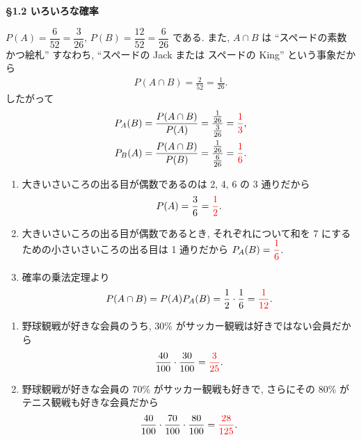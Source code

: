 \vspace{\baselineskip}
{\textbf{\S 1.2 \indent いろいろな確率}}
\basic
\begin{qenumerate}
	\item{
		$P(A) = \dfrac{6}{52} = \dfrac{3}{26}$, $P(B) = \dfrac{12}{52} = \dfrac{6}{26}$ である.
		また, $A\cap B$ は ``スペードの素数かつ絵札'' すなわち, ``スペードの Jack または スペードの King'' という事象だから
		\begin{align}
			P(A\cap B) = \frac{2}{52} = \frac{1}{26}.
		\end{align}
		したがって
		\begin{align}
			P_{A}(B) &= \frac{P(A\cap B)}{P(A)} = \frac{\frac{1}{26}}{\frac{3}{26}} = \textcolor{red}{\frac{1}{3}}, \\
			P_{B}(A) &= \frac{P(A\cap B)}{P(B)} = \frac{\frac{1}{26}}{\frac{6}{26}} = \textcolor{red}{\frac{1}{6}}.
		\end{align}
	}
	\item{
		\begin{enumerate}
			\item{
				大きいさいころの出る目が偶数であるのは 2, 4, 6 の 3 通りだから
				\begin{align}
					P(A) = \frac{3}{6} = \textcolor{red}{\frac{1}{2}}.
				\end{align}
			}
			\item{
				大きいさいころの出る目が偶数であるとき, それぞれについて和を 7 にするための小さいさいころの出る目は 1 通りだから $P_{A}(B) = \textcolor{red}{\dfrac{1}{6}}$.
			}
			\item{
				確率の乗法定理より
				\begin{align}
					P(A\cap B) = P(A)P_{A}(B) = \frac{1}{2}\cdot\frac{1}{6} = \textcolor{red}{\frac{1}{12}}.
				\end{align}
			}
		\end{enumerate}
	}
	\item{
		\begin{enumerate}
			\item{
				野球観戦が好きな会員のうち, 30\% がサッカー観戦は好きではない会員だから
				\begin{align}
					\frac{40}{100}\cdot\frac{30}{100} = \textcolor{red}{\frac{3}{25}}.
				\end{align}
			}
			\item{
				野球観戦が好きな会員の 70\% がサッカー観戦も好きで, さらにその 80\% がテニス観戦も好きな会員だから
				\begin{align}
					\frac{40}{100}\cdot\frac{70}{100}\cdot\frac{80}{100} = \textcolor{red}{\frac{28}{125}}.
				\end{align}
}
\end{enumerate}}
\end{qenumerate}
